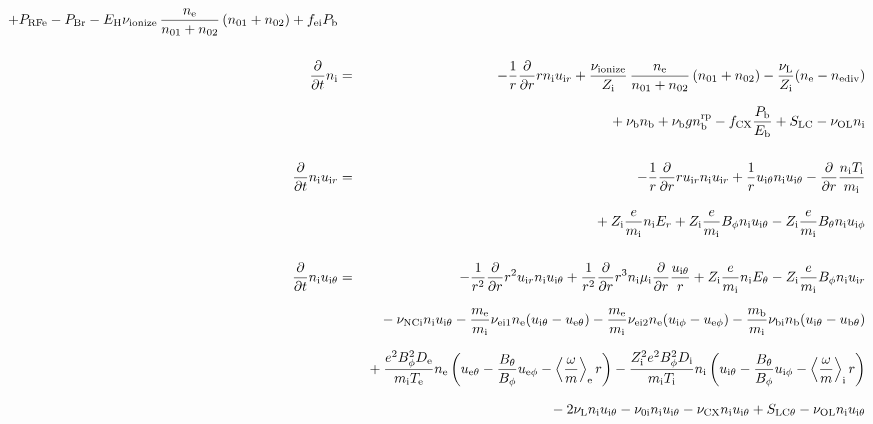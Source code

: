 \documentclass[11pt]{article}
\def\r#1{{\rm#1}}
\def\ddt{\frac{\partial}{\partial t}}
\def\ddr{\frac{\partial}{\partial r}}
\def\ave#1{\left\langle#1\right\rangle}
\def\me{m_\r{e}}
\def\mi{m_\r{i}}
\def\mb{m_\r{b}}
\def\mue{\mu_\r{e}}
\def\mui{\mu_\r{i}}
\def\De{D_\r{e}}
\def\Di{D_\r{i}}
\def\ne{n_\r{e}}
\def\ni{n_\r{i}}
\def\nb{n_\r{b}}
\def\uir{u_{\r{i}r}}
\def\ueth{u_{\r{e}\theta}}
\def\uith{u_{\r{i}\theta}}
\def\ubth{u_{\r{b}\theta}}
\def\ueph{u_{\r{e}\phi}}
\def\uiph{u_{\r{i}\phi}}
\def\Er{E_r}
\def\Eth{E_\theta}
\def\Bth{B_\theta}
\def\Bph{B_\phi}
\def\Te{T_\r{e}}
\def\Ti{T_\r{i}}
\def\nna{n_{01}}
\def\nnb{n_{02}}
\def\Zi{Z_\r{i}}
\def\Pb{P_\r{b}}
\def\Eb{E_\r{b}}
\def\PRFe{P_\r{RFe}}
\def\PBr{P_\r{Br}}
\def\EH{E_\r{H}}
\def\fei{f_\r{ei}}
\def\nbrp{n_\r{b}^\r{rp}}
\def\fCX{f_\r{CX}}
\def\nuNCi{\nu_\r{NCi}}
\def\nubi{\nu_\r{bi}}
\def\nuni{\nu_\r{0i}}
\def\nuL{\nu_\r{L}}
\def\nuCX{\nu_\r{CX}}
\def\nuion{\nu_\r{ionize}}
\def\nub{\nu_\r{b}}
\def\nediv{n_\r{ediv}}
\def\nuOL{\nu_\r{OL}}
\newcommand{\Frac}[2]{%
  {\displaystyle {\displaystyle #1\over \displaystyle #2}}%
}
\newcommand{\rdprd}[2]{\Frac{\partial #1}{\partial #2}}
\newcommand{\aveaveB}[1]{\left< \!\! \left< #1 \right> \!\! \right>}
\begin{document}
\begin{eqnarray}
%
  + \PRFe
%
  - \PBr
%
  - \EH \nuion\, \frac{\ne}{\nna+\nnb}\, (\nna+\nnb)
%
  + \fei \Pb
\\[5mm]
%
%
  \ddt\ni &=&
%
  - \frac{1}{r} \ddr r \ni \uir
%
  + \frac{\nuion}{\Zi}\, \frac{\ne}{\nna+\nnb}\, (\nna+\nnb)
%
  - \frac{\nuL}{\Zi} (\ne - \nediv) 
\nonumber\\[2.5mm]&&{}
%
  + \nub \nb
%
  + \nub g \nbrp
%
  - \fCX \frac{\Pb}{\Eb}
%
  + S_\r{LC}
%
  - \nuOL \ni
\\[5mm]
%
%
  \ddt \ni \uir &=&
%
  - \frac{1}{r} \ddr r \uir \ni \uir
%
  + \frac{1}{r} \uith \ni \uith
%
  - \ddr \frac{\ni \Ti}{\mi}
\nonumber\\[3mm]&&{}
%
  + \Zi \frac{e}{\mi}\ni \Er
%
  + \Zi \frac{e}{\mi} \Bph \ni \uith
%
  - \Zi \frac{e}{\mi} \Bth \ni \uiph
\\[5mm]
%
%
  \ddt \ni \uith &=&
%
  - \frac{1}{r^2} \ddr r^2 \uir \ni \uith
%
  + \frac{1}{r^2} \ddr r^3 \ni \mui \ddr \frac{\uith}{r}
%
  + \Zi \frac{e}{\mi} \ni \Eth
%
  - \Zi \frac{e}{\mi} \Bph \ni \uir
\nonumber\\[2.5mm]&&{}
%
  - \nuNCi \ni \uith
%
  - \frac{\me}{\mi} \nu_\r{ei1} \ne (\uith - \ueth)
%
  - \frac{\me}{\mi} \nu_\r{ei2} \ne (\uiph - \ueph)
%
  - \frac{\mb}{\mi} \nubi \nb (\uith - \ubth)
\nonumber\\[2.5mm]&&{}
%
  + \frac{e^2 \Bph^2 \De}{\mi\Te}\ne
    \left(\ueth - \frac{\Bth}{\Bph}\ueph - \ave{\frac{\omega}{m}}_\r{e}
     r \right)
%
  - \frac{\Zi^2 e^2 \Bph^2 \Di}{\mi\Ti}\ni
    \left(\uith - \frac{\Bth}{\Bph}\uiph - \ave{\frac{\omega}{m}}_\r{i}
     r \right)
%
\nonumber\\[2.5mm]&&{}
%
  - 2 \nuL \ni \uith
%
  - \nuni \ni \uith
%
  - \nuCX \ni \uith
%
  + S_\r{LC\theta}
%
  - \nuOL \ni \uith

\end{eqnarray}
\end{document}
